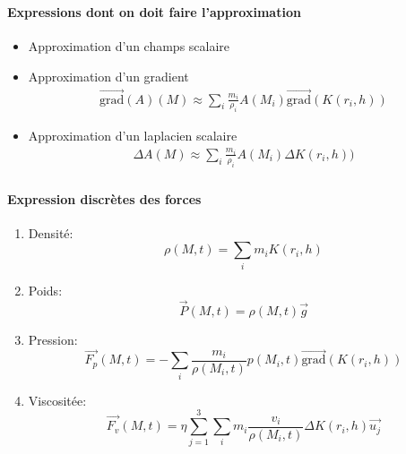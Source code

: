 \begin{frame}
    \frametitle{\sndpti}
    \framesubtitle{Expressions dont on doit faire l'approximation}

    \begin{itemize}
        \item<1-> Approximation d'un champs scalaire \\


        \item<5-> Approximation d'un gradient
        \begin{align*}
            \vec{\text{grad}}(A)(M) \approx \sum_i \frac{m_i}{\rho_i}A(M_i) \vec{\text{grad}}(K(r_i, h))
        \end{align*}

        
        \item<6-> Approximation d'un laplacien scalaire
        \begin{align*}
            \Delta A (M) \approx \sum_i \frac{m_i}{\rho_i}A(M_i) \Delta K(r_i, h))
        \end{align*}
    \end{itemize}

\end{frame}

\begin{frame}
    \frametitle{\sndpti}
    \framesubtitle{Expression discrètes des forces}

    \begin{enumerate}
        \item Densité: $$\rho(M,t) =\sum_i m_i K(r_i, h)$$
        \item Poids: $$\vec{P}(M,t) = \rho(M,t)\vec{g}$$
        \item Pression: $$\vec{F_p}(M,t) = -\sum_i \frac{m_i}{\rho(M_i,t)} p(M_i,t) \vec{\text{grad}}(K(r_i, h))$$
        \item Viscositée: $$\vec{F_{v}}(M,t) = \eta \sum_{j=1}^3 \sum_i m_i \frac{v_i}{\rho(M_i,t)} \Delta K(r_i, h)\vec{u_j}$$
    \end{enumerate}

\end{frame}
